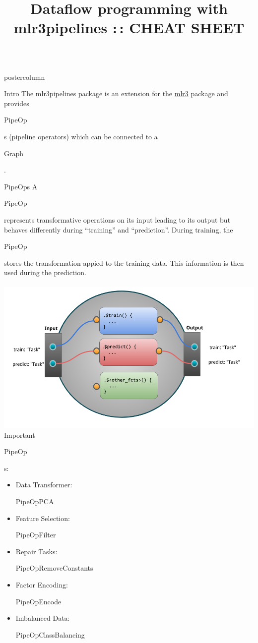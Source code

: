 \documentclass{beamer}
\title{Dataflow programming with mlr3pipelines :\,: CHEAT SHEET} %
\newlength{\columnheight} %
\newcommand{\codeinline}[1]{\begin{codeboxinline}#1\end{codeboxinline}}
\begin{document}
\begin{frame}[fragile]{}
	\begin{columns}
		\begin{column}{.245\textwidth}
			\begin{beamercolorbox}[center]{postercolumn}
				\begin{minipage}{.98\textwidth}
					\parbox[t][\columnheight]{\textwidth}{
						\begin{myblock}{Intro}
              The mlr3pipelines package is an extension for the \href{https://github.com/mlr-org/mlr3}{mlr3} package and provides \codeinline{PipeOp}s (pipeline operators) which can be connected to a \codeinline{Graph}.
            \end{myblock}
						\begin{myblock}{PipeOps}
              A \codeinline{PipeOp} represents transformative operations on its input leading to its output but behaves differently during ``training'' and ``prediction''. During training, the \codeinline{PipeOp} stores the transformation appied to the training data. This information is then used during the prediction.\\
              \ \\
              \includegraphics[width=\textwidth]{img/po_viz.png}
              Important \codeinline{PipeOp}s:
              \begin{itemize}
                \item Data Transformer: \codeinline{PipeOpPCA}
                \item Feature Selection: \codeinline{PipeOpFilter}
                \item Repair Tasks: \codeinline{PipeOpRemoveConstants}
                \item Factor Encoding: \codeinline{PipeOpEncode}
                \item Imbalanced Data: \codeinline{PipeOpClassBalancing}

\end{itemize}
\end{myblock}}
\end{minipage}
\end{beamercolorbox}
\end{column}
\end{columns}
\end{frame}
\end{document}
